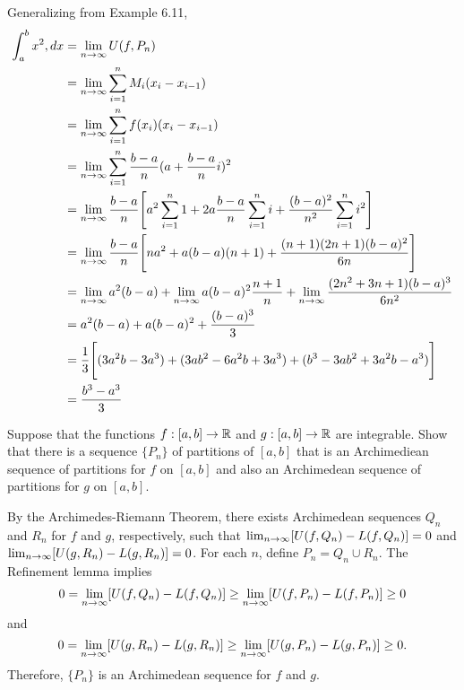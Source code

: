 \documentclass[letterpaper, twoside, 12pt]{book}
\begin{document}
\begin{solution}
    Generalizing from Example 6.11, 
     \begin{align*}
        \int_a^b x^2, dx&= \lim_{n \to \infty} U(f, P_n) \\
                        &= \lim_{n \to \infty} \sum_{i = 1}^n M_i (x_i - x_{i-1}) \\
                        &= \lim_{n \to \infty} \sum_{i = 1}^n f(x_{i}) (x_i - x_{i-1}) \\
                        &= \lim_{n \to \infty} \sum_{i = 1}^n \frac{b - a}{n} (a + \frac{b-a}{n} i)^2 \\
                        &= \lim_{n \to \infty} \frac{b - a}{n} \Bigg [ a^2 \sum_{i = 1}^n 1 + 2a \frac{b-a}{n} \sum_{i = 1}^n i + \frac{(b-a)^2}{n^2} \sum_{i = 1}^n i^2 \Bigg ] \\ 
                        &= \lim_{n \to \infty} \frac{b - a}{n} \Bigg [ na^2 + a(b - a)(n + 1) + \frac{ (n + 1)(2n + 1)(b - a)^2}{6n} \Bigg ] \\
                        &= \lim_{n \to \infty} a^2 (b - a) + \lim_{n \to \infty} a(b - a)^2 \frac{n+1}{n} + \lim_{n \to \infty} \frac{ (2n^2 + 3n + 1) (b - a)^3}{6n^2} \\
                        &= a^2 (b - a) + a(b - a)^2 + \frac{(b - a)^3}{3} \\
                        &= \frac{1}{3} \Bigg [ (3a^2 b - 3a^3) + (3ab^2 - 6a^2 b + 3a^3) + (b^3 - 3ab^2 + 3a^2 b - a^3) \Bigg ] \\  
                        &= \frac{b^3 - a^3}{3} \\
    \end{align*}
\end{solution}


\begin{exercise}[9]
  Suppose that the functions \(f:[a,b]\to\mathbb R\) and
  \(g:[a,b]\to\mathbb R\) are integrable. Show that there is a sequence
  \(\{P_n\}\) of partitions of \([a,b]\) that is an Archimediean sequence
  of partitions for \(f\) on \([a,b]\) and also an Archimedean sequence
  of partitions for \(g\) on \([a,b]\).
\end{exercise}
\begin{solution}
    By the Archimedes-Riemann Theorem, there exists Archimedean sequences
    \(Q_n\) and \(R_n\) for \(f\) and \(g\), respectively, such that 
    \( \lim_{n \to \infty} [U(f, Q_n) - L(f, Q_n)] = 0\) and \(\lim_{n \to \infty} [U(g, R_n) - L(g, R_n)] = 0\).
    For each \(n\), define \(P_n = Q_n \cup R_n\). The Refinement lemma implies
    \[ 0 = \lim_{n \to \infty} [U(f, Q_n) - L(f, Q_n)] \geq \lim_{n \to \infty} [U(f, P_n) - L(f, P_n)] \geq 0 \]
    and 
    \[ 0 = \lim_{n \to \infty} [U(g, R_n) - L(g, R_n)] \geq \lim_{n \to \infty} [U(g, P_n) - L(g, P_n)] \geq 0 .\]
    Therefore, \(\{P_n\}\) is an Archimedean sequence for \(f\) and \(g\).
\end{solution}
\end{document}
